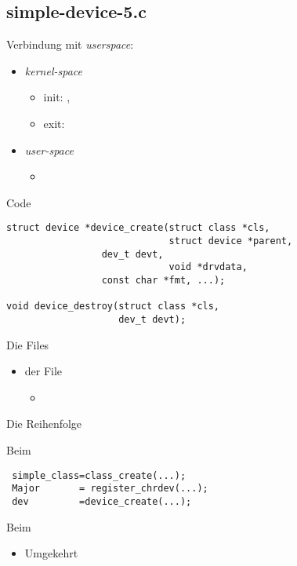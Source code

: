 \subsection{simple-device-5.c}
\begin{frame}{}{Verbindung mit {\em userspace}: }
 \begin{itemize}
  \item {\em kernel-space}
  \begin{itemize}
   \item init: , 
   \item exit: 
  \end{itemize}
  \item {\em user-space}
  \begin{itemize}
   \item {}
  \end{itemize}
 \end{itemize}
\end{frame}

\begin{frame}[fragile]{Code}
\begin{lstlisting}
struct device *device_create(struct class *cls, 
                             struct device *parent,
			     dev_t devt, 
                             void *drvdata,
			     const char *fmt, ...);

void device_destroy(struct class *cls, 
                    dev_t devt);
\end{lstlisting}
\end{frame}

\begin{frame}{Die Files}{}
\begin{itemize}
 \item der File
 \begin{itemize}
  \item {}
 \end{itemize}
\end{itemize}
\end{frame}

\begin{frame}[fragile]{Die Reihenfolge}
\begin{block}{Beim }
\begin{lstlisting}
 simple_class=class_create(...);
 Major       = register_chrdev(...);
 dev         =device_create(...);
\end{lstlisting}
\end{block}
\begin{block}{Beim }
 \begin{itemize}
  \item Umgekehrt
 \end{itemize}
\end{block}
\end{frame} 
